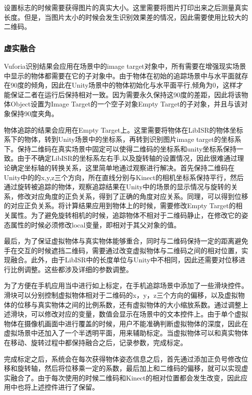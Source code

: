 设置标志的时候需要获得图片的真实大小。这里需要将图片打印出来之后测量真实长度。但是，当图片太小的时候会发生识别效果差的情况，因此需要使用比较大的二维码。

\subsubsection{虚实融合}
Vuforia识别结果会应用在场景中的image target对象中，所有需要在增强现实场景中显示的物体都需要在它的子对象中。由于物体在初始的追踪场景中与水平面就存在90度的倾角，因此在Unity场景中的物体初始化与水平面平行,倾角为0，这样才能保证二者在运行后保持相对一致。因为需要永久保持这90度的差距，因此将该物体Object设置为Image Target的一个空子对象Empty Target的子对象，并且与该对象保持90度夹角。

物体追踪的结果会应用在Empty Target上。这里需要将物体在LibISR的物体坐标系下的物体，转到Unity场景中的坐标系，再转到识别图片image target的坐标系下。保持二维码在真实场景中固定可以使得二维码的坐标系和unity坐标系保持一致。由于不确定LibISR的坐标系左右手,以及旋转轴的设置情况，因此很难通过理论确定坐标轴的转换关系，这里简单地通过观察进行解决。首先保持二维码在Unity中的的x,y,z三个方向，所在直线分别与Kinect的相机坐标系保持平行，然后通过旋转被追踪的物体，观察追踪结果在Unity中的场景的显示情况与旋转的关系，修改对应角度的正负关系，得到了正确的角度对应关系。同理，可以得到位移的对应正负关系。将计算结果应用到物体上的时候，需要修改Empty Target的相关属性。为了避免旋转相机的时候，追踪物体不相对于二维码静止，在修改它的姿态属性的时候必须修改local变量，即相对于其父对象的值。

最后，为了保证虚拟物体与真实物体能够重合，同时与二维码保持一定的距离避免手在交互的时候遮挡二维码，需要通过改变虚拟物体与二维码之间的相对位置，实现融合。此外，由于LibISR中的长度单位与Unity中不相同，因此还需要对位移进行比例调整。这些都涉及详细的参数调整。

为了方便在手机应用当中进行如上标定，在手机追踪场景中添加了一些滑块控件。滑块可以分别控制虚拟物体相对于二维码的x，y，z三个方向的偏移，以及虚拟物体的位移与真实物体之间的比例系数，还有虚拟物体的大小缩放系数。通过调整上述滑块，可以修改对应的变量，数值会显示在场景中的文本控件上。由于单个虚拟物体在摄像机画面中进行覆盖的时候，用户不能准确判断虚拟物体的深度，因此在虚拟场景中还加入了一个半透明平面，用来辅助标定。当虚拟物体可以和真实物体在移动、旋转过程中都保持融合之后，记录参数，完成标定。

完成标定之后，系统会在每次获得物体姿态信息之后，首先通过添加正负号修改位移和旋转轴，然后将位移乘一定的系数，最后加上和二维码的偏移，就可以实现虚实融合了。由于每次使用的时候二维码和Kinect的相对位置都会发生改变，因此应用中也将上述控件进行了保留。

